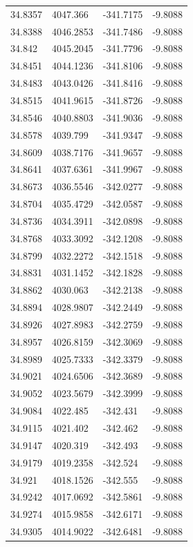 \begin{table}[H]
\begin{tabular}{llll}
34.8357 & 4047.366 & -341.7175 & -9.8088 \\
34.8388 & 4046.2853 & -341.7486 & -9.8088 \\
34.842 & 4045.2045 & -341.7796 & -9.8088 \\
34.8451 & 4044.1236 & -341.8106 & -9.8088 \\
34.8483 & 4043.0426 & -341.8416 & -9.8088 \\
34.8515 & 4041.9615 & -341.8726 & -9.8088 \\
34.8546 & 4040.8803 & -341.9036 & -9.8088 \\
34.8578 & 4039.799 & -341.9347 & -9.8088 \\
34.8609 & 4038.7176 & -341.9657 & -9.8088 \\
34.8641 & 4037.6361 & -341.9967 & -9.8088 \\
34.8673 & 4036.5546 & -342.0277 & -9.8088 \\
34.8704 & 4035.4729 & -342.0587 & -9.8088 \\
34.8736 & 4034.3911 & -342.0898 & -9.8088 \\
34.8768 & 4033.3092 & -342.1208 & -9.8088 \\
34.8799 & 4032.2272 & -342.1518 & -9.8088 \\
34.8831 & 4031.1452 & -342.1828 & -9.8088 \\
34.8862 & 4030.063 & -342.2138 & -9.8088 \\
34.8894 & 4028.9807 & -342.2449 & -9.8088 \\
34.8926 & 4027.8983 & -342.2759 & -9.8088 \\
34.8957 & 4026.8159 & -342.3069 & -9.8088 \\
34.8989 & 4025.7333 & -342.3379 & -9.8088 \\
34.9021 & 4024.6506 & -342.3689 & -9.8088 \\
34.9052 & 4023.5679 & -342.3999 & -9.8088 \\
34.9084 & 4022.485 & -342.431 & -9.8088 \\
34.9115 & 4021.402 & -342.462 & -9.8088 \\
34.9147 & 4020.319 & -342.493 & -9.8088 \\
34.9179 & 4019.2358 & -342.524 & -9.8088 \\
34.921 & 4018.1526 & -342.555 & -9.8088 \\
34.9242 & 4017.0692 & -342.5861 & -9.8088 \\
34.9274 & 4015.9858 & -342.6171 & -9.8088 \\
34.9305 & 4014.9022 & -342.6481 & -9.8088 \\

\end{tabular}
\end{table}
